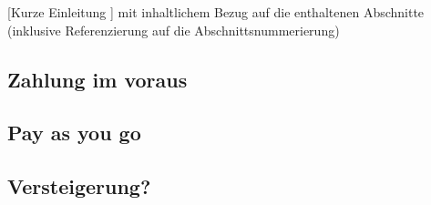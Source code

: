 [Kurze Einleitung ] mit inhaltlichem Bezug auf die enthaltenen Abschnitte (inklusive Referenzierung auf die Abschnittsnummerierung)


\subsection{Zahlung im voraus }

\subsection{Pay as you go }

\subsection{Versteigerung? }

